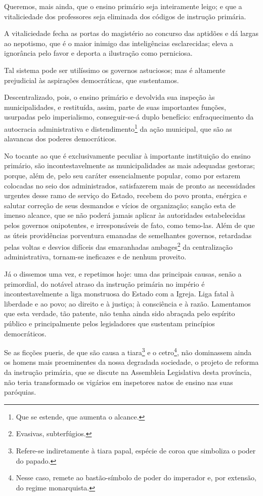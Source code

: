 Queremos, mais ainda, que o ensino primário seja inteiramente leigo; e
que a vitaliciedade dos professores seja eliminada dos códigos de
instrução primária.

A vitaliciedade fecha as portas do magistério ao concurso das aptidões e
dá largas ao nepotismo, que é o maior inimigo das inteligências
esclarecidas; eleva a ignorância pelo favor e deporta a ilustração como
perniciosa.

Tal sistema pode ser utilíssimo os governos astuciosos; mas é altamente
prejudicial às aspirações democráticas, que sustentamos.

Descentralizado, pois, o ensino primário e devolvida sua inspeção às
municipalidades, e restituída, assim, parte de suas importantes funções,
usurpadas pelo imperialismo, conseguir-se-á duplo benefício:
enfraquecimento da autocracia administrativa e distendimento\footnote{
  Que se estende, que aumenta o alcance.} da ação municipal, que são as
alavancas dos poderes democráticos.

No tocante ao que é exclusivamente peculiar à importante instituição do
ensino primário, são incontestavelmente as municipalidades as mais
adequadas gestoras; porque, além de, pelo seu caráter essencialmente
popular, como por estarem colocadas no seio dos administrados,
satisfazerem mais de pronto as necessidades urgentes desse ramo de
serviço do Estado, recebem do povo pronta, enérgica e salutar correção
de seus desmandos e vícios de organização; sanção esta de imenso
alcance, que se não poderá jamais aplicar às autoridades estabelecidas
pelos governos onipotentes, e irresponsáveis de fato, como temo-las.
Além de que as úteis providências porventura emanadas de semelhantes
governos, retardadas pelas voltas e desvios difíceis das emaranhadas
ambages\footnote{Evasivas, subterfúgios.} da centralização
administrativa, tornam-se ineficazes e de nenhum proveito.

Já o dissemos uma vez, e repetimos hoje: uma das principais causas,
senão a primordial, do notável atraso da instrução primária no império é
incontestavelmente a liga monstruosa do Estado com a Igreja. Liga fatal
à liberdade e ao povo; ao direito e à justiça; à consciência e à razão.
Lamentamos que esta verdade, tão patente, não tenha ainda sido abraçada
pelo espírito público e principalmente pelos legisladores que sustentam
princípios democráticos.

Se as ficções pueris, de que são causa a tiara\footnote{Refere-se
  indiretamente à tiara papal, espécie de coroa que simboliza o poder do
  papado.} e o cetro\footnote{Nesse caso, remete ao bastão-símbolo de
  poder do imperador e, por extensão, do regime monarquista.}, não
dominassem ainda os homens mais proeminentes da nossa degradada
sociedade, o projeto de reforma da instrução primária, que se discute na
Assembleia Legislativa desta província, não teria transformado os
vigários em inspetores natos de ensino nas suas paróquias.

